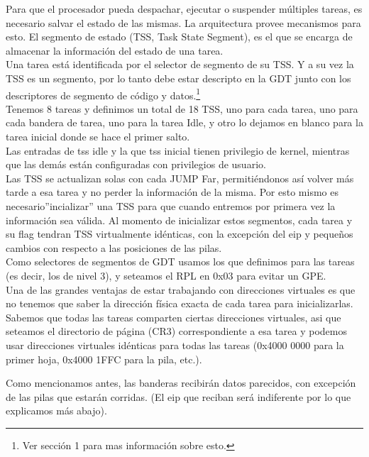Para que el procesador pueda despachar, ejecutar o suspender m\'ultiples tareas, es necesario salvar el estado de las mismas. La 
arquitectura provee mecanismos para esto. El segmento de estado (TSS, Task State Segment), es el que se encarga de almacenar la 
informaci\'on del estado de una tarea.\\

Una tarea est\'a identificada por el selector de segmento de su TSS. Y a su vez la TSS es un segmento, por lo tanto debe estar descripto 
en la GDT junto con los descriptores de segmento de c\'odigo y datos.\footnote{Ver secci\'on 1 para mas informaci\'on sobre esto.}\\

Tenemos 8 tareas y definimos un total de 18 TSS, uno para cada tarea, uno para cada bandera de tarea, uno para la tarea Idle, y otro lo 
dejamos en blanco para la tarea inicial donde se hace el primer salto.\\
Las entradas de tss idle y la que tss inicial tienen privilegio de kernel, mientras que las dem\'as est\'an configuradas con privilegios 
de usuario.\\

Las TSS se actualizan solas con cada JUMP Far, permiti\'endonos as\'i volver m\'as tarde a esa tarea y no perder la informaci\'on de la 
misma. Por esto mismo es necesario''incializar'' una TSS para que cuando entremos por primera vez la informaci\'on
sea v\'alida. Al momento de inicializar estos segmentos, cada tarea y su flag tendran TSS virtualmente id\'enticas, con la excepci\'on del
 eip y pequeños cambios con respecto a las posiciones de las pilas.\\

Como selectores de segmentos de GDT usamos los que definimos para las tareas (es decir, los de nivel 3), y seteamos el RPL en 0x03 para 
evitar un GPE.\\

Una de las grandes ventajas de estar trabajando con direcciones virtuales es que no tenemos que saber la direcci\'on f\'isica exacta de
cada tarea para inicializarlas. Sabemos que todas las tareas comparten ciertas direcciones virtuales, asi que seteamos el directorio de 
p\'agina (CR3) correspondiente a esa tarea y podemos usar direcciones virtuales id\'enticas para todas las tareas (0x4000 0000 para la primer hoja, 0x4000 1FFC para la pila, etc.). 

Como mencionamos antes, las banderas recibir\'an datos parecidos, con excepci\'on de las pilas que estar\'an corridas. (El eip que reciban ser\'a indiferente por lo 
que explicamos m\'as abajo).

